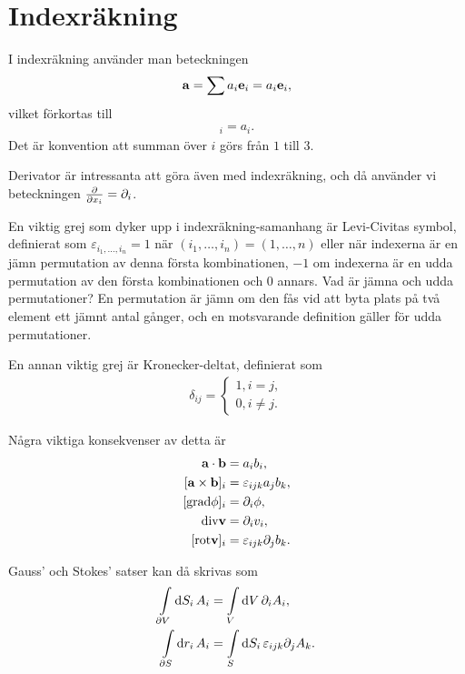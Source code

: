 \section{Indexräkning}

I indexräkning använder man beteckningen
\begin{align*}
	\vb{a} = \sum a_i\vb{e}_i = a_i\vb{e}_i,
\end{align*}
vilket förkortas till
\begin{align*}
	[\vb{a}]_i = a_i.
\end{align*}
Det är konvention att summan över $i$ görs från $1$ till $3$.

Derivator är intressanta att göra även med indexräkning, och då använder vi beteckningen
$\pdv{x_i} = \del{i}$.

En viktig grej som dyker upp i indexräkning-samanhang är Levi-Civitas symbol, definierat som $\varepsilon_{i_1, \dots, i_n} = 1$ när $(i_1, \dots, i_n) = (1, \dots, n)$ eller när indexerna är en jämn permutation av denna första kombinationen, $-1$ om indexerna är en udda permutation av den första kombinationen och $0$ annars. Vad är jämna och udda permutationer? En permutation är jämn om den fås vid att byta plats på två element ett jämnt antal gånger, och en motsvarande definition gäller för udda permutationer.

En annan viktig grej är Kronecker-deltat, definierat som
\begin{align*}
	\delta_{ij} =
	\begin{cases}
		1, i = j, \\
		0, i\neq j.
	\end{cases}
\end{align*}

Några viktiga konsekvenser av detta är
\begin{align*}
	\vb{a}\cdot\vb{b}      &= a_ib_i, \\
	[\vb{a}\times\vb{b}]_i &= \leci{ijk}a_jb_k, \\
	[\grad{\phi}]_i        &= \del{i}{\phi}, \\
	\div{\vb{v}}           &= \del{i}{v_i}, \\
	[\curl{\vb{v}}]_i      &= \leci{ijk}\del{j}{b_k}.
\end{align*}

Gauss' och Stokes' satser kan då skrivas som
\begin{align*}
	\int\limits_{\partial V}\dd{S_i}A_i &= \int\limits_{V}\dd{V}\partial_{i}A_i, \\
	\int\limits_{\partial S}\dd{r_i}A_i &= \int\limits_{S}\dd{S_i}\varepsilon_{ijk}\partial_{j}A_k.
\end{align*}